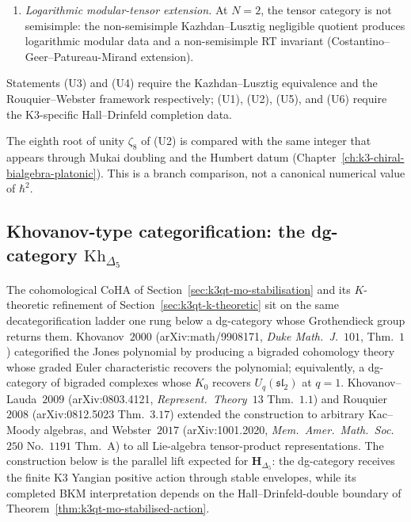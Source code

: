 \begin{conjecture}
\begin{enumerate}[label=\textup{(U\arabic*)}]
 \item \emph{Logarithmic modular-tensor extension.} At $N = 2$, the tensor category is not semisimple: the non-semisimple Kazhdan--Lusztig negligible quotient produces logarithmic modular data and a non-semisimple RT invariant (Costantino--Geer--Patureau-Mirand extension).
\end{enumerate}
Statements (U3) and (U4) require the Kazhdan--Lusztig equivalence and
the Rouquier--Webster framework respectively; (U1), (U2), (U5), and
(U6) require the K3-specific Hall--Drinfeld completion data.
\end{conjecture}

\begin{remark}
\label{rem:root-unity-koszul-conductor-face}
The eighth root of unity \(\zeta_8\) of (U2) is compared with the same
integer that appears through Mukai doubling and the Humbert datum
(Chapter~\ref{ch:k3-chiral-bialgebra-platonic}). This is a branch
comparison, not a canonical numerical value of \(\hbar^2\).
\end{remark}

\subsection{Khovanov-type categorification: the dg-category \texorpdfstring{$\mathrm{Kh}_{\Delta_5}$}{Kh-Delta-5}}
\label{subsec:k3qt-khovanov-categorification}

The cohomological CoHA of Section~\ref{sec:k3qt-mo-stabilisation} and
its $K$-theoretic refinement of Section~\ref{sec:k3qt-k-theoretic}
sit on the same decategorification ladder one rung below a dg-category
whose Grothendieck group returns them. Khovanov~$2000$
(arXiv:math/9908171, \emph{Duke Math.\ J.}~$101$, Thm.\ $1$) categorified
the Jones polynomial by producing a bigraded cohomology theory whose
graded Euler characteristic recovers the polynomial; equivalently, a
dg-category of bigraded complexes whose $K_0$ recovers
$U_q(\mathfrak{sl}_2)$ at $q = 1$. Khovanov--Lauda~$2009$
(arXiv:0803.4121, \emph{Represent.\ Theory}~$13$ Thm.\ $1.1$) and
Rouquier~$2008$ (arXiv:0812.5023 Thm.\ $3.17$) extended the
construction to arbitrary Kac--Moody algebras, and Webster~$2017$
(arXiv:1001.2020, \emph{Mem.\ Amer.\ Math.\ Soc.}~$250$ No.\ $1191$
Thm.\ A) to all Lie-algebra tensor-product representations.
The construction below is the parallel lift expected for
$\mathbf H_{\Delta_5}$: the dg-category receives the finite K3 Yangian
positive action through stable envelopes, while its completed BKM
interpretation depends on the Hall--Drinfeld-double boundary of
Theorem~\ref{thm:k3qt-mo-stabilised-action}.

